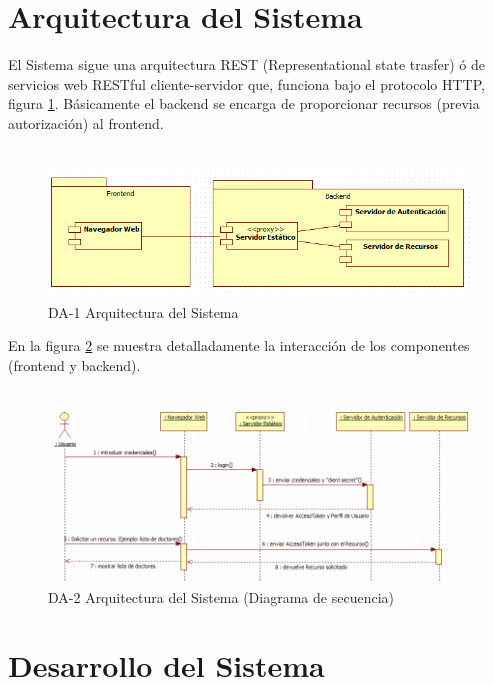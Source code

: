 	\section{Arquitectura del Sistema}
	
		El Sistema sigue una arquitectura REST (Representational state trasfer) ó
		de servicios web RESTful cliente-servidor que, funciona bajo el protocolo
		HTTP, figura \ref{figure:arq1}. Básicamente el backend se encarga 
		de proporcionar recursos (previa autorización) al frontend.
		\\\
		
		\begin{figure}[ht!]
		    \centering
			\includegraphics[width=18cm]{../imgs/disenio/arq1.png}
			\caption{DA-1 Arquitectura del Sistema}
			\label{figure:arq1}
		\end{figure}
		
		
		En la figura \ref{figure:arq2} se muestra detalladamente la interacción de los
		componentes (frontend y backend).
		\\\
		
		\begin{figure}[ht!]
		    \centering
			\includegraphics[width=18cm]{../imgs/disenio/arq2.png}
			\caption{DA-2 Arquitectura del Sistema (Diagrama de secuencia)}
			\label{figure:arq2}
		\end{figure}			
		
	\section{Desarrollo del Sistema}
		
